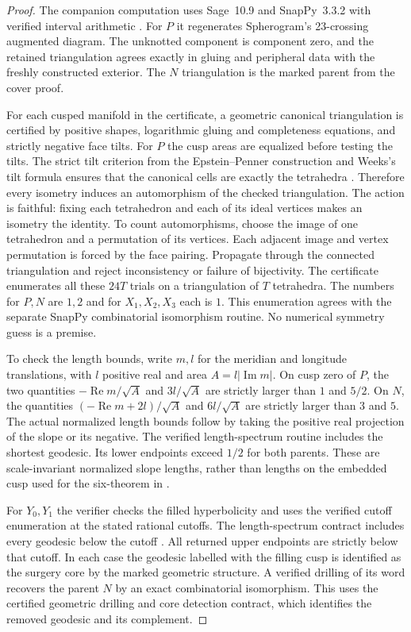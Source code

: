 \documentclass[11pt]{article}
\begin{document}
\begin{proof}
The companion computation uses Sage~10.9 and SnapPy~3.3.2 with
verified interval arithmetic \cite{snappy}. For $P$ it regenerates
Spherogram's 23-crossing augmented diagram. The unknotted component
is component zero, and the retained triangulation agrees exactly
in gluing and peripheral data with the freshly constructed exterior.
The $N$ triangulation is the marked parent from the cover proof.

For each cusped manifold in the certificate, a geometric canonical
triangulation is certified by positive shapes, logarithmic gluing and
completeness equations, and strictly negative face tilts. For $P$ the
cusp areas are equalized before testing the tilts. The strict tilt
criterion from the Epstein--Penner construction and Weeks's tilt
formula ensures that the canonical cells are exactly the tetrahedra
\cite[Sections~3.1--3.3]{tetra}. Therefore every isometry induces an
automorphism of the checked triangulation. The action is faithful:
fixing each tetrahedron and each of its ideal vertices makes an
isometry the identity. To count automorphisms, choose the image of
one tetrahedron and a permutation of its vertices. Each adjacent
image and vertex permutation is forced by the face pairing.
Propagate through the connected triangulation and reject
inconsistency or failure of bijectivity. The certificate enumerates
all these $24T$ trials on a triangulation of $T$ tetrahedra. The
numbers for $P,N$ are $1,2$ and for $X_1,X_2,X_3$ each is $1$.
This enumeration agrees with the separate SnapPy combinatorial
isomorphism routine. No numerical symmetry guess is a premise.

To check the length bounds, write $m,l$ for the meridian and longitude
translations, with $l$ positive real and area $A=l|\operatorname{Im}m|$.
On cusp zero of $P$, the two quantities
$-\operatorname{Re}m/\sqrt A$ and $3l/\sqrt A$ are strictly larger
than $1$ and $5/2$. On $N$, the quantities
$(-\operatorname{Re}m+2l)/\sqrt A$ and $6l/\sqrt A$ are strictly larger
than $3$ and $5$. The actual normalized length bounds follow by taking
the positive real projection of the slope or its negative. The
verified length-spectrum routine includes the shortest geodesic.
Its lower endpoints exceed $1/2$ for both parents. These are
scale-invariant normalized slope lengths, rather than lengths on the
embedded cusp used for the six-theorem in \cite{covers}.

For $Y_0,Y_1$ the verifier checks the filled hyperbolicity and uses
the verified cutoff enumeration at the stated rational cutoffs. The
length-spectrum contract includes every geodesic below the cutoff
\cite{snappy}. All returned upper endpoints are strictly below that
cutoff. In each case the geodesic labelled with the filling cusp is
identified as the surgery core by the marked geometric structure.
A verified drilling of its word recovers the parent $N$ by an exact
combinatorial isomorphism. This uses the certified geometric drilling
and core detection contract, which identifies the removed geodesic
and its complement.


\end{proof}
\end{document}
